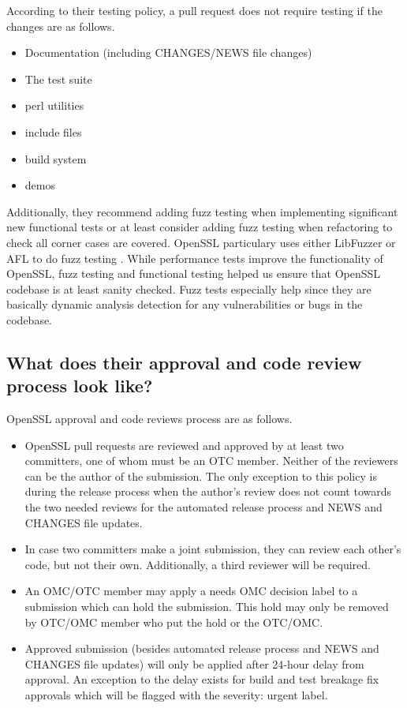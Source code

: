 \documentclass[conference]{IEEEtran}
\begin{document}
According to their testing policy, a pull request does not require testing
if the changes are as follows\cite{9}.

\begin{itemize}
\item Documentation (including CHANGES/NEWS file changes)
\item The test suite
\item perl utilities
\item include files
\item build system
\item demos
\end{itemize}

Additionally, they recommend adding fuzz testing when implementing
significant new functional tests or at least consider adding fuzz
testing when refactoring to check all corner cases are
covered\cite{9}.  OpenSSL particulary uses either LibFuzzer or AFL to
do fuzz testing \cite{11}. While performance tests improve the
functionality of OpenSSL, fuzz testing and functional testing helped
us ensure that OpenSSL codebase is at least sanity checked. Fuzz tests
especially help since they are basically dynamic analysis detection
for any vulnerabilities or bugs in the codebase.

\subsection{What does their approval and code review process look like?}
    OpenSSL approval and code reviews process are as follows.

    \begin{itemize}
        \item OpenSSL pull requests are reviewed and approved by at
          least two committers, one of whom must be an OTC
          member. Neither of the reviewers can be the author of the
          submission\cite{7}.  The only exception to this policy is during
          the release process when the author's review does not count
          towards the two needed reviews for the automated release
          process and NEWS and CHANGES file updates\cite{7}.

        \item In case two committers make a joint submission, they can
          review each other's code, but not their own. Additionally, a
          third reviewer will be required\cite{7}.

        \item An OMC/OTC member may apply a needs OMC decision label
          to a submission which can hold the submission. This hold may
          only be removed by OTC/OMC member who put the hold or the
          OTC/OMC\cite{7}.

        \item Approved submission (besides automated release process
          and NEWS and CHANGES file updates) will only be applied
          after 24-hour delay from approval. An exception to the delay
          exists for build and test breakage fix approvals which will
          be flagged with the severity: urgent label\cite{7}.
    \end{itemize}
\end{document}
